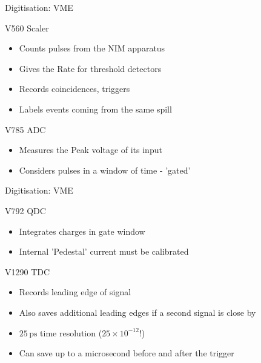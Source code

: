 \documentclass[9pt]{beamer}
\begin{document}
\begin{frame}{Digitisation: VME}
  \begin{block}{V560 Scaler}
    \begin{itemize}
      \item Counts pulses from the NIM apparatus
      \item Gives the Rate for threshold detectors
      \item Records coincidences, triggers
      \item Labels events coming from the same spill
    \end{itemize}
  \end{block}
  \begin{block}{V785 ADC}
    \begin{itemize}
      \item Measures the Peak voltage of its input
      \item Considers pulses in a window of time - 'gated'
    \end{itemize}
  \end{block}
\end{frame}

\begin{frame}{Digitisation: VME}
  \begin{block}{V792 QDC}
  \begin{itemize}
    \item Integrates charges in gate window
    \item Internal 'Pedestal' current must be calibrated
  \end{itemize}
\end{block}
\begin{block}{V1290 TDC}
  \begin{itemize}
    \item Records leading edge of signal
    \item Also saves additional leading edges if a second signal is close by
    \item $25\,\mathrm{ps}$ time resolution ($25\times10^{-12}$!)
    \item Can save up to a microsecond before and after the trigger
  \end{itemize}
\end{block}
\end{frame}
\end{document}
